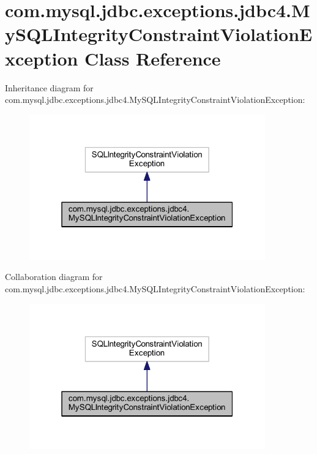 \hypertarget{classcom_1_1mysql_1_1jdbc_1_1exceptions_1_1jdbc4_1_1_my_s_q_l_integrity_constraint_violation_exception}{}\section{com.\+mysql.\+jdbc.\+exceptions.\+jdbc4.\+My\+S\+Q\+L\+Integrity\+Constraint\+Violation\+Exception Class Reference}
\label{classcom_1_1mysql_1_1jdbc_1_1exceptions_1_1jdbc4_1_1_my_s_q_l_integrity_constraint_violation_exception}


Inheritance diagram for com.\+mysql.\+jdbc.\+exceptions.\+jdbc4.\+My\+S\+Q\+L\+Integrity\+Constraint\+Violation\+Exception\+:
\nopagebreak
\begin{figure}[H]
\begin{center}
\leavevmode
\includegraphics[width=289pt]{classcom_1_1mysql_1_1jdbc_1_1exceptions_1_1jdbc4_1_1_my_s_q_l_integrity_constraint_violation_exception__inherit__graph}
\end{center}
\end{figure}


Collaboration diagram for com.\+mysql.\+jdbc.\+exceptions.\+jdbc4.\+My\+S\+Q\+L\+Integrity\+Constraint\+Violation\+Exception\+:
\nopagebreak
\begin{figure}[H]
\begin{center}
\leavevmode
\includegraphics[width=289pt]{classcom_1_1mysql_1_1jdbc_1_1exceptions_1_1jdbc4_1_1_my_s_q_l_integrity_constraint_violation_exception__coll__graph}
\end{center}
\end{figure}
